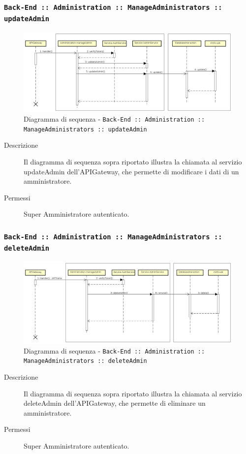 \documentclass[../DefinizioneDiProdotto_v3.0.0.tex]{subfiles}
\begin{document}
\newpage
\subsubsection{\texttt{Back-End :: Administration :: ManageAdministrators :: updateAdmin}}
\begin{figure}[!h]
	\centering
	\includegraphics[width=\textwidth]{DiagrammiSequenza/Back-End/manageAdministrators/updateAdmin.png}
	\caption{Diagramma di sequenza - \texttt{Back-End :: Administration :: ManageAdministrators :: updateAdmin }}
\end{figure}
\begin{description}
	\item [Descrizione] Il diagramma di sequenza sopra riportato illustra la chiamata al servizio updateAdmin dell'APIGateway, che permette di modificare i dati di un amministratore.
	\item [Permessi] Super Amministratore autenticato.
\end{description}

\subsubsection{\texttt{Back-End :: Administration :: ManageAdministrators :: deleteAdmin}}
\begin{figure}[!h]
	\centering
	\includegraphics[width=\textwidth]{DiagrammiSequenza/Back-End/manageAdministrators/deleteAdmin.png}
	\caption{Diagramma di sequenza - \texttt{Back-End :: Administration :: ManageAdministrators :: deleteAdmin }}
\end{figure}
\begin{description}
	\item [Descrizione] Il diagramma di sequenza sopra riportato illustra la chiamata al servizio deleteAdmin dell'APIGateway, che permette di eliminare un amministratore.
	\item [Permessi] Super Amministratore autenticato.
\end{description}
\end{document}
